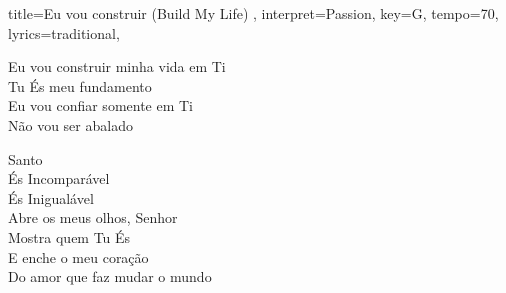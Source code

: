 \documentclass[a4paper, 12pt]{article}
\newcommand{\music}{Eu vou construir (Build My Life) }
\newcommand{\autor}{Passion}
\newcommand{\tom}{G} %
\newcommand{\bpm}{70}
\newcommand{\transpose}{0}
\begin{document}
\begin{song}[transpose=\transpose]{
  title={\music}, 
  interpret={\autor}, 
  key=\tom,
  tempo={\bpm},
  lyrics={traditional},
  }
\begin{multicols}{2}
  \begin{interludio}
       
  \end{interludio}

  \begin{ponte}
    Eu vou construir minha vida em Ti \\
    Tu És meu fundamento \\
    Eu vou confiar somente em Ti \\
    Não vou ser abalado
  \end{ponte}

  \begin{refraoDois}
    Santo \\
    És Incomparável \\
    És Inigualável \\
    Abre os meus olhos, Senhor \\
    Mostra quem Tu És \\
    E enche o meu coração \\
    Do amor que faz mudar o mundo
  \end{refraoDois}

  \begin{fim}
  \end{fim}

\end{multicols}
  
\end{song}
\end{document}
